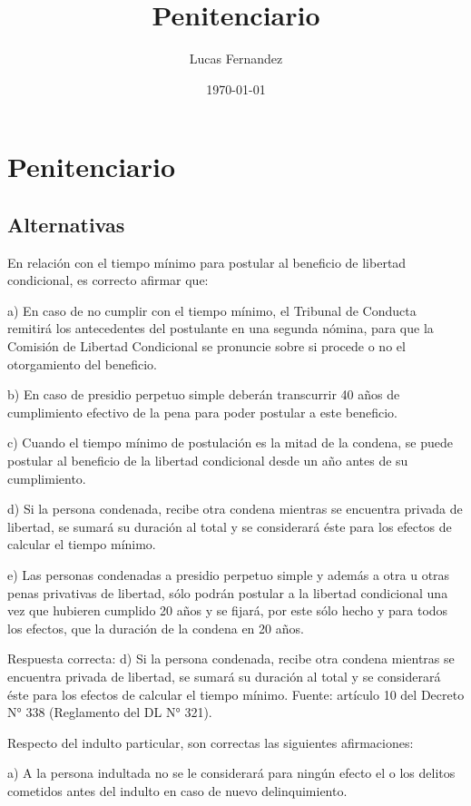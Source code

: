 \documentclass[letterpaper, 11pt]{article}
\author{Lucas Fernandez}
\date{\today}
\title{Penitenciario}
\begin{document}
\maketitle
\tableofcontents

\section{Penitenciario}
\label{sec:org16b112e}

\subsection{Alternativas}
\label{sec:org16a69c5}

En relación con el tiempo mínimo para postular al beneficio de libertad condicional, es
correcto afirmar que:

a) En caso de no cumplir con el tiempo mínimo, el Tribunal de Conducta remitirá los
antecedentes del postulante en una segunda nómina, para que la Comisión de Libertad
Condicional se pronuncie sobre si procede o no el otorgamiento del beneficio.

b) En caso de presidio perpetuo simple deberán transcurrir 40 años de cumplimiento
efectivo de la pena para poder postular a este beneficio.

c) Cuando el tiempo mínimo de postulación es la mitad de la condena, se puede postular al
beneficio de la libertad condicional desde un año antes de su cumplimiento.

d) Si la persona condenada, recibe otra condena mientras se encuentra privada de libertad,
se sumará su duración al total y se considerará éste para los efectos de calcular el tiempo
mínimo.

e) Las personas condenadas a presidio perpetuo simple y además a otra u otras penas
privativas de libertad, sólo podrán postular a la libertad condicional una vez que hubieren
cumplido 20 años y se fijará, por este sólo hecho y para todos los efectos, que la duración
de la condena en 20 años.

Respuesta correcta:
d) Si la persona condenada, recibe otra condena mientras se
encuentra privada de libertad, se sumará su duración al total y se considerará éste para
los efectos de calcular el tiempo mínimo.
Fuente: artículo 10 del Decreto N° 338 (Reglamento del DL N° 321).

Respecto del indulto particular, son correctas las siguientes afirmaciones:

a) A la persona indultada no se le considerará para ningún efecto el o los delitos cometidos
antes del indulto en caso de nuevo delinquimiento.
\end{document}
